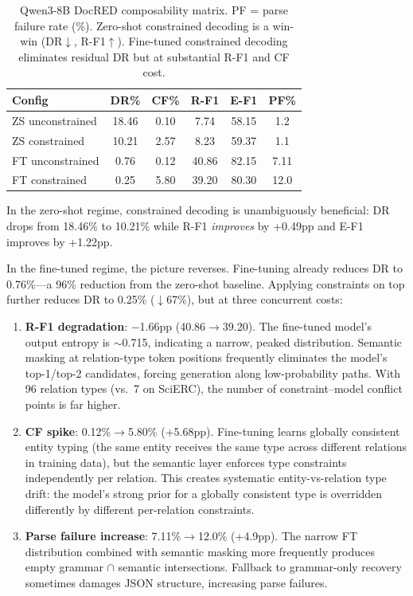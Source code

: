 \documentclass[11pt,a4paper]{article}
\begin{document}
\begin{table}[t]
\centering
\small
\begin{tabular}{lccccc}
\toprule
\textbf{Config} & \textbf{DR\%} & \textbf{CF\%} & \textbf{R-F1} & \textbf{E-F1} & \textbf{PF\%} \\
\midrule
ZS unconstrained & 18.46 & 0.10 & 7.74 & 58.15 & 1.2 \\
ZS constrained & 10.21 & 2.57 & 8.23 & 59.37 & 1.1 \\
\midrule
FT unconstrained & 0.76 & 0.12 & 40.86 & 82.15 & 7.11 \\
FT constrained & 0.25 & 5.80 & 39.20 & 80.30 & 12.0 \\
\bottomrule
\end{tabular}
\caption{Qwen3-8B DocRED composability matrix. PF = parse failure rate (\%). Zero-shot constrained decoding is a win-win (DR$\downarrow$, R-F1$\uparrow$). Fine-tuned constrained decoding eliminates residual DR but at substantial R-F1 and CF cost.}
\label{tab:qwen-docred-ft}
\end{table}

In the zero-shot regime, constrained decoding is unambiguously beneficial: DR drops from 18.46\% to 10.21\% while R-F1 \emph{improves} by +0.49pp and E-F1 improves by +1.22pp.

In the fine-tuned regime, the picture reverses. Fine-tuning already reduces DR to 0.76\%---a 96\% reduction from the zero-shot baseline. Applying constraints on top further reduces DR to 0.25\% ($\downarrow$67\%), but at three concurrent costs:

\begin{enumerate}
    \item \textbf{R-F1 degradation}: $-$1.66pp (40.86$\to$39.20). The fine-tuned model's output entropy is $\sim$0.715, indicating a narrow, peaked distribution. Semantic masking at relation-type token positions frequently eliminates the model's top-1/top-2 candidates, forcing generation along low-probability paths. With 96 relation types (vs.\ 7 on SciERC), the number of constraint--model conflict points is far higher.

    \item \textbf{CF spike}: 0.12\%$\to$5.80\% (+5.68pp). Fine-tuning learns globally consistent entity typing (the same entity receives the same type across different relations in training data), but the semantic layer enforces type constraints independently per relation. This creates systematic entity-vs-relation type drift: the model's strong prior for a globally consistent type is overridden differently by different per-relation constraints.

    \item \textbf{Parse failure increase}: 7.11\%$\to$12.0\% (+4.9pp). The narrow FT distribution combined with semantic masking more frequently produces empty grammar $\cap$ semantic intersections. Fallback to grammar-only recovery sometimes damages JSON structure, increasing parse failures.
\end{enumerate}
\end{document}
